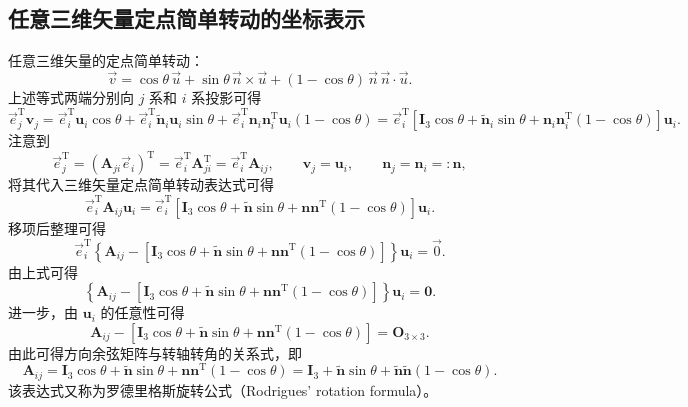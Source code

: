 \subsection{任意三维矢量定点简单转动的坐标表示}
任意三维矢量的定点简单转动：
\[
\vec{v}=\cos\theta\,\vec{u}+\sin\theta\,\vec{n}\times\vec{u}+(1-\cos\theta)\,\vec{n}\,\vec{n}\cdot\vec{u}.
\]
上述等式两端分别向 $j$ 系和 $i$ 系投影可得
\[
\vec{e}_j^{\mathrm{T}}\boldsymbol{v}_j=\vec{e}_i^{\mathrm{T}}\boldsymbol{u}_i\cos\theta+\vec{e}_i^{\mathrm{T}}\tilde{\boldsymbol{n}}_i\boldsymbol{u}_i\sin\theta+\vec{e}_i^{\mathrm{T}}\boldsymbol{n}_i\boldsymbol{n}_i^{\mathrm{T}}\boldsymbol{u}_i(1-\cos\theta)=\vec{e}_i^{\mathrm{T}}\left[\boldsymbol{I}_3\cos\theta+\tilde{\boldsymbol{n}}_i\sin\theta+\boldsymbol{n}_i\boldsymbol{n}_i^{\mathrm{T}}(1-\cos\theta)\right]\boldsymbol{u}_i.
\]
注意到
\[
\vec{e}_j^{\mathrm{T}}=(\boldsymbol{A}_{ji}\vec{e}_i)^{\mathrm{T}}=\vec{e}_i^{\mathrm{T}}\boldsymbol{A}_{ji}^{\mathrm{T}}=\vec{e}_i^{\mathrm{T}}\boldsymbol{A}_{ij},\qquad\boldsymbol{v}_j=\boldsymbol{u}_i,\qquad\boldsymbol{n}_j=\boldsymbol{n}_i=:\boldsymbol{n},
\]
将其代入三维矢量定点简单转动表达式可得
\[
\vec{e}_i^{\mathrm{T}}\boldsymbol{A}_{ij}\boldsymbol{u}_i=\vec{e}_i^{\mathrm{T}}\left[\boldsymbol{I}_3\cos\theta+\tilde{\boldsymbol{n}}\sin\theta+\boldsymbol{n}\boldsymbol{n}^{\mathrm{T}}(1-\cos\theta)\right]\boldsymbol{u}_i.
\]
移项后整理可得
\[
\vec{e}_i^{\mathrm{T}}\left\{\boldsymbol{A}_{ij}-\left[\boldsymbol{I}_3\cos\theta+\tilde{\boldsymbol{n}}\sin\theta+\boldsymbol{n}\boldsymbol{n}^{\mathrm{T}}(1-\cos\theta)\right]\right\}\boldsymbol{u}_i=\vec{0}.
\]
由上式可得
\[
\left\{\boldsymbol{A}_{ij}-\left[\boldsymbol{I}_3\cos\theta+\tilde{\boldsymbol{n}}\sin\theta+\boldsymbol{n}\boldsymbol{n}^{\mathrm{T}}(1-\cos\theta)\right]\right\}\boldsymbol{u}_i=\boldsymbol{0}.
\]
进一步，由 $\boldsymbol{u}_i$ 的任意性可得
\[
\boldsymbol{A}_{ij}-\left[\boldsymbol{I}_3\cos\theta+\tilde{\boldsymbol{n}}\sin\theta+\boldsymbol{n}\boldsymbol{n}^{\mathrm{T}}(1-\cos\theta)\right]=\boldsymbol{O}_{3\times3}.
\]
由此可得方向余弦矩阵与转轴转角的关系式，即
\[
\boldsymbol{A}_{ij}=\boldsymbol{I}_3\cos\theta+\tilde{\boldsymbol{n}}\sin\theta+\boldsymbol{n}\boldsymbol{n}^{\mathrm{T}}(1-\cos\theta)=\boldsymbol{I}_3+\tilde{\boldsymbol{n}}\sin\theta+\tilde{\boldsymbol{n}}\tilde{\boldsymbol{n}}(1-\cos\theta).
\]
该表达式又称为罗德里格斯旋转公式（Rodrigues' rotation formula）。

